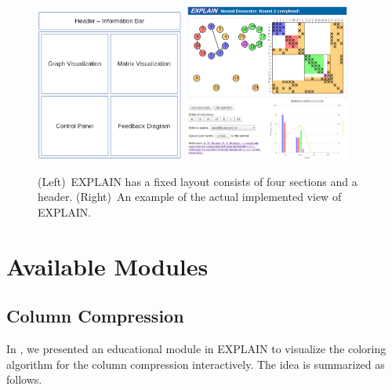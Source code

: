 \documentclass[11pt, twoside,a4paper]{book}
\begin{document}
\begin{figure}
\centering
\includegraphics[width=0.44\textwidth]{explain-vis.png}
\hfill
\includegraphics[width=0.48\textwidth]{explain2-init.png}
\caption{
(Left)~\mbox{EXPLAIN} has a fixed layout consists of four sections and a header.
(Right)~An example of the actual implemented view of \mbox{EXPLAIN}.}
\label{explain-design}
\end{figure}
\section{Available Modules}
\label{s.av.modules}
\subsection{Column Compression}
\label{s.column-compression}
In \cite{2013:05,2014:01}, we presented an educational module in \mbox{EXPLAIN} to visualize the
coloring algorithm for the column compression interactively. The idea is
summarized as follows.
\end{document}
